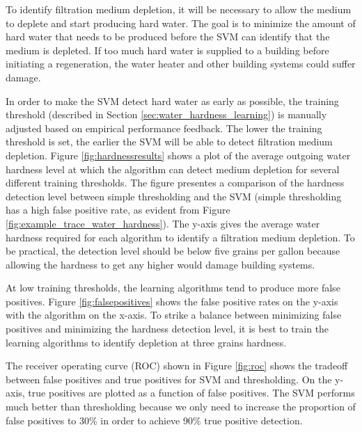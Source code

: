 To identify filtration medium depletion, it will be necessary to allow the medium to deplete and start producing hard water.
 The goal is to minimize the amount of hard water that needs to be produced before the SVM can identify that the medium is depleted.
 If too much hard water is supplied to a building before initiating a regeneration, the water heater and other building systems could suffer damage.


In order to make the SVM detect hard water as early as possible, the training threshold (described in Section \ref{sec:water_hardness_learning}) is manually adjusted based on empirical performance feedback.
 The lower the training threshold is set, the earlier the SVM will be able to detect filtration medium depletion.
 Figure \ref{fig:hardnessresults} shows a plot of the average outgoing water hardness level at which the algorithm can detect medium depletion for several different training thresholds.
 The figure presentes a comparison of the hardness detection level between simple thresholding and the SVM (simple thresholding has a high false positive rate, as evident from Figure \ref{fig:example_trace_water_hardness}).
 The y-axis gives the average water hardness required for each algorithm to identify a filtration medium depletion.
 To be practical, the detection level should be below five grains per gallon because allowing the hardness to get any higher would damage building systems.


At low training thresholds, the learning algorithms tend to produce more false positives.
 Figure \ref{fig:falsepositives} shows the false positive rates on the y-axis with the algorithm on the x-axis.
 To strike a balance between minimizing false positives and minimizing the hardness detection level, it is best to train the learning algorithms to identify depletion at three grains hardness.


The receiver operating curve (ROC) shown in Figure \ref{fig:roc} shows the tradeoff between false positives and true positives for SVM and thresholding.
 On the y-axis, true positives are plotted as a function of false positives.
 The SVM performs much better than thresholding because we only need to increase the proportion of false positives to 30\% in order to achieve 90\% true positive detection.



